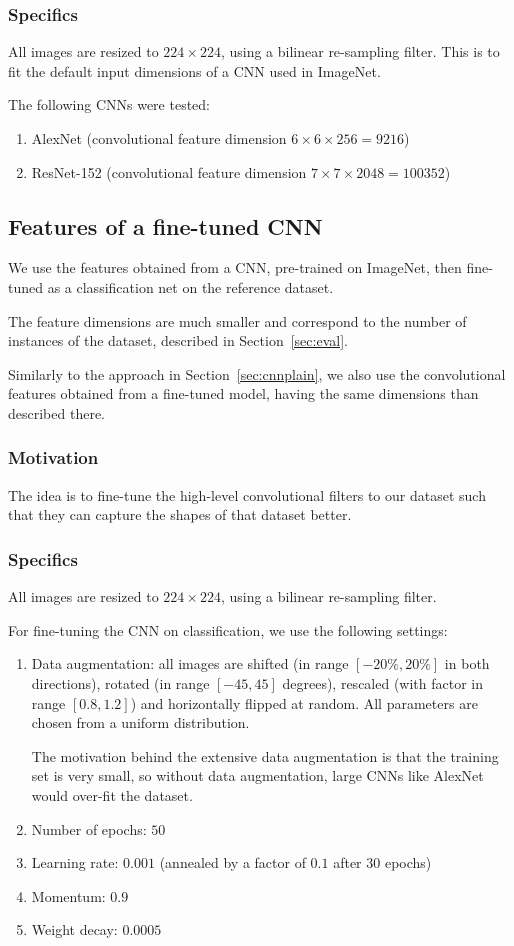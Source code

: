 \documentclass[fleqn]{article}
\begin{document}
\subsubsection{Specifics}
All images are resized to $224 \times 224$, using a bilinear
re-sampling filter. This is to fit the default input dimensions of
a CNN used in ImageNet.

The following CNNs were tested:
\begin{enumerate}
    \item AlexNet (convolutional feature dimension $6 \times 6 \times 256 = 9216$)
    \item ResNet-152 (convolutional feature dimension $7 \times 7 \times 2048 =100352$)
\end{enumerate}

\subsection{Features of a fine-tuned CNN}
We use the features obtained from a CNN, pre-trained on ImageNet,
then fine-tuned as a classification net on the reference dataset.

The feature dimensions are much smaller and correspond to the number
of instances of the dataset, described in Section~\ref{sec:eval}.

Similarly to the approach in Section~\ref{sec:cnnplain},
we also use the convolutional features obtained from a fine-tuned model,
having the same dimensions than described there.
\subsubsection{Motivation}
The idea is to fine-tune the high-level convolutional filters
to our dataset such that they can capture the shapes of that dataset better.
\subsubsection{Specifics}
All images are resized to $224 \times 224$, using a bilinear
re-sampling filter.

For fine-tuning the CNN on classification, we use the following settings:
\begin{enumerate}
    \item Data augmentation: all images are shifted (in range $[-20\%, 20\%]$ in both directions), rotated (in range $[-45, 45]$ degrees), rescaled (with factor in range $[0.8, 1.2]$) and horizontally flipped at random.
    All parameters are chosen from a uniform distribution.

    The motivation behind the extensive data augmentation is that
    the training set is very small, so without data augmentation,
    large CNNs like AlexNet would over-fit the dataset.
    \item Number of epochs: $50$
    \item Learning rate: $0.001$ (annealed by a factor of $0.1$ after 30 epochs)
    \item Momentum: $0.9$
    \item Weight decay: $0.0005$
\end{enumerate}
\end{document}
